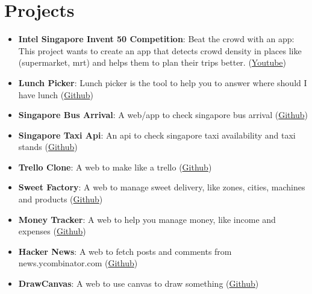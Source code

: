 \documentclass[letterpaper,11pt]{article}
\newcommand{\resumeItem}[2]{
  \item\small{
    \textbf{#1}{: #2 \vspace{-2pt}}
  }
}
\newcommand{\resumeSubItem}[2]{\resumeItem{#1}{#2}\vspace{-4pt}}
\newcommand{\resumeSubHeadingListStart}{\begin{itemize}[leftmargin=*]}
\newcommand{\resumeSubHeadingListEnd}{\end{itemize}}
\begin{document}
\section{Projects}
  \resumeSubHeadingListStart
    \resumeSubItem{Intel Singapore Invent 50 Competition}
      {Beat the crowd with an app: This project wants to create an app that detects crowd density in places like (supermarket, mrt) and helps them to plan their trips better. (\href{https://www.youtube.com/watch?v=0AEbxRXz-tM&ab_channel=HardwareZoneSG}{Youtube})}
    \resumeSubItem{Lunch Picker}
      {Lunch picker is the tool to help you to answer where should I have lunch (\href{https://github.com/yeukfei02}{Github})}
    \resumeSubItem{Singapore Bus Arrival}
      {A web/app to check singapore bus arrival (\href{https://github.com/yeukfei02}{Github})}
    \resumeSubItem{Singapore Taxi Api}
      {An api to check singapore taxi availability and taxi stands (\href{https://github.com/yeukfei02}{Github})}
    \resumeSubItem{Trello Clone}
      {A web to make like a trello (\href{https://github.com/yeukfei02}{Github})}
    \resumeSubItem{Sweet Factory}
      {A web to manage sweet delivery, like zones, cities, machines and products (\href{https://github.com/yeukfei02}{Github})}
    \resumeSubItem{Money Tracker}
      {A web to help you manage money, like income and expenses (\href{https://github.com/yeukfei02}{Github})}
    \resumeSubItem{Hacker News}
      {A web to fetch posts and comments from news.ycombinator.com (\href{https://github.com/yeukfei02}{Github})}
    \resumeSubItem{DrawCanvas}
      {A web to use canvas to draw something (\href{https://github.com/yeukfei02}{Github})}
  \resumeSubHeadingListEnd


\end{document}
